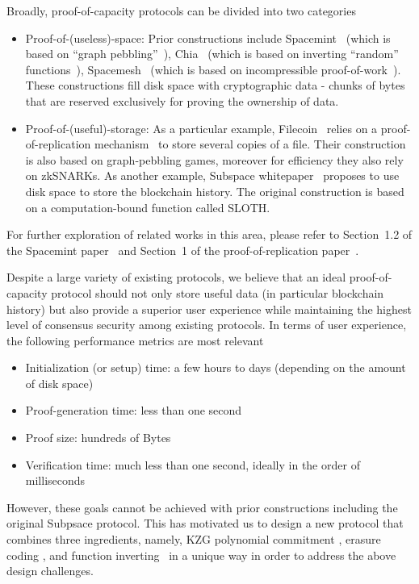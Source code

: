 \documentclass[conference]{IEEEtran}
\begin{document}
Broadly, proof-of-capacity protocols can be divided into two categories
\begin{itemize}
    \item Proof-of-(useless)-space: Prior constructions include Spacemint~\cite{spacemint} (which is based on ``graph pebbling''~\cite{proof_of_space, pose}), Chia~\cite{chia} (which is based on inverting ``random'' functions~\cite{proof_of_space, beyond_hellman}), Spacemesh~\cite{spacemesh} (which is based on incompressible proof-of-work~\cite{post}). These constructions fill disk space with cryptographic data - chunks of bytes that are reserved exclusively for proving the ownership of data. 
    \item Proof-of-(useful)-storage: As a particular example, Filecoin~\cite{filecoin} relies on a proof-of-replication mechanism~\cite{proof_of_replication_BFisch} to store several copies of a file. Their construction is also based on graph-pebbling games, moreover for efficiency they also rely on zkSNARKs. As another example, Subspace whitepaper~\cite{subspacev1} proposes to use disk space to store the blockchain history. The original construction is based on a computation-bound function called SLOTH.
\end{itemize}
For further exploration of related works in this area, please refer to Section~1.2 of the Spacemint paper~\cite{spacemint} and Section~1 of the proof-of-replication paper~\cite{proof_of_replication_BFisch}.

Despite a large variety of existing protocols, 
we believe that an ideal proof-of-capacity protocol should not only store useful data (in particular blockchain history) but also provide a superior
user experience while maintaining the highest level of consensus security among existing protocols.
In terms of user experience, the following performance metrics are most relevant 
\begin{itemize}
    \item Initialization (or setup) time: a few hours to days (depending on the amount of disk space)
    \item Proof-generation time: less than one second
    \item Proof size: hundreds of Bytes
    \item Verification time: much less than one second, ideally in the order of milliseconds
\end{itemize}

However, these goals cannot be achieved with prior constructions including the original Subpsace protocol. This has motivated us to design a new protocol that combines three ingredients, namely, KZG polynomial commitment  \cite{KZG_paper}, erasure coding \cite{erasure}, and function inverting~\cite{beyond_hellman} in a unique way in order to address the above design challenges. 
\end{document}
